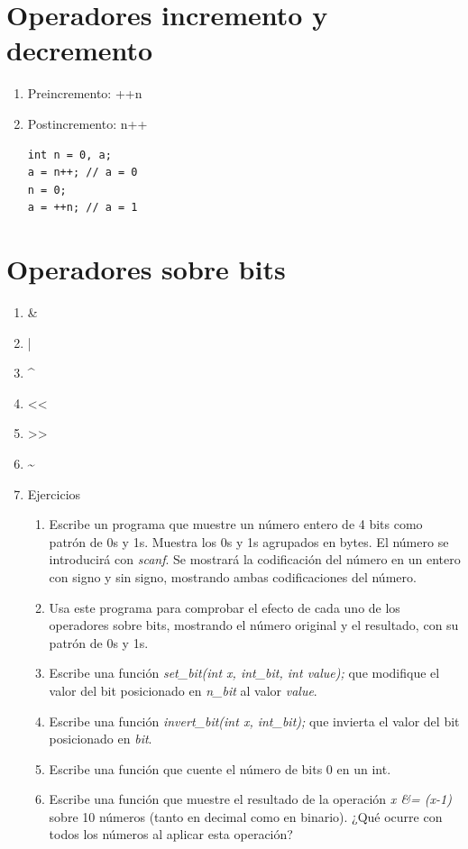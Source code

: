 \documentclass[a4paper,oneside]{article}
\begin{document}
\section{Operadores incremento y decremento}
  \begin{enumerate}
  \item Preincremento: ++n
  \item Postincremento: n++

    \begin{verbatim}
int n = 0, a;
a = n++; // a = 0
n = 0;
a = ++n; // a = 1
    \end{verbatim}
  \end{enumerate}

\section{Operadores sobre bits}
  \begin{enumerate}
  \item \&
  \item |
  \item \^{}
  \item <<
  \item >>
  \item \~{}
  \item Ejercicios
    \begin{enumerate}
      \item Escribe un programa que muestre un número entero de 4 bits como patrón de 0s y 1s. Muestra los 0s y 1s agrupados en bytes. El número se introducirá con \textit{scanf}. Se mostrará la codificación del número en un entero con signo y sin signo, mostrando ambas codificaciones del número.
    \item Usa este programa para comprobar el efecto de cada uno de los operadores sobre bits, mostrando el número original y el resultado, con su patrón de 0s y 1s.
    \item Escribe una función \textit{set\_bit(int x, int\_bit, int value);} que modifique el valor del bit posicionado en \textit{n\_bit} al valor \textit{value}.
    \item Escribe una función \textit{invert\_bit(int x, int\_bit);} que invierta el valor del bit posicionado en \textit{bit}.
    \item Escribe una función que cuente el número de bits 0 en un int.
    \item Escribe una función que muestre el resultado de la operación \textit{x \&= (x-1)} sobre 10 números (tanto en decimal como en binario). ¿Qué ocurre con todos los números al aplicar esta operación?
    \end{enumerate}
  \end{enumerate}
\end{document}
